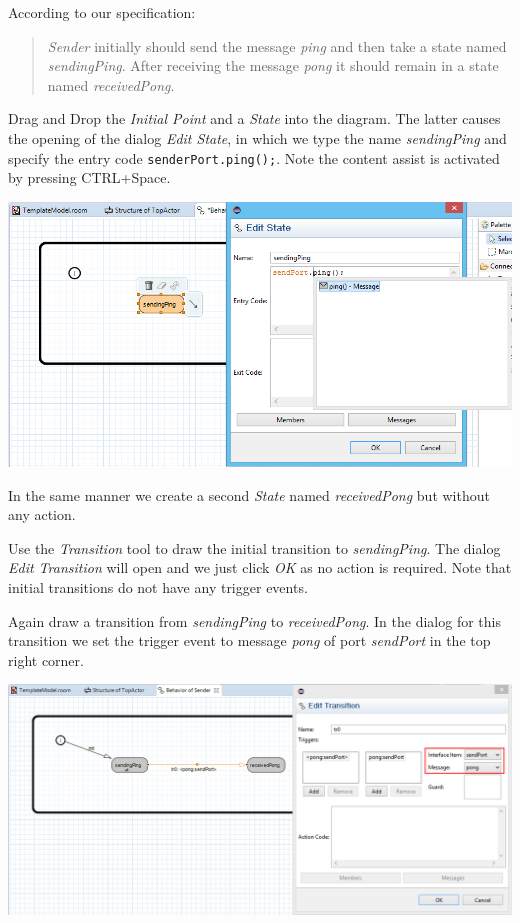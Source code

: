 According to our specification:
\begin{quote}
	 \emph{Sender} initially should send the message \emph{ping} and then take a state named \emph{sendingPing}. After receiving the message \emph{pong} it should remain in a state named \emph{receivedPong}.
\end{quote}

Drag and Drop the \textit{Initial Point} and a \textit{State} into the diagram. The latter causes the opening of the dialog \emph{Edit State}, in which we type the name \emph{sendingPing} and specify the entry code \verb|senderPort.ping();|. Note the content assist is activated by pressing CTRL+Space.

\includegraphics[width=.8\textwidth]{images/015-edit-sending.png}

In the same manner we create a second \emph{State} named \emph{receivedPong} but without any action.
 
Use the \textit{Transition} tool to draw the initial transition to \textit{sendingPing}. The dialog \emph{Edit Transition} will open and we just click \emph{OK} as no action is required. Note that initial transitions do not have any trigger events.

Again draw a transition from \textit{sendingPing} to \textit{receivedPong}. In the dialog for this transition we set the trigger event to message \emph{pong} of port \emph{sendPort} in the top right corner.

\includegraphics[width=\textwidth]{images/015-edit-transition-pinger.png}

